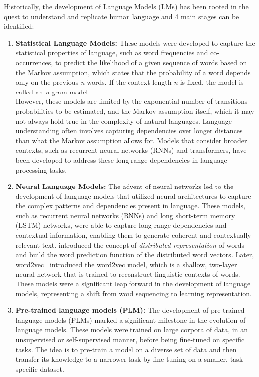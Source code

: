 Historically, the development of Language Models (LMs) has been rooted in the quest to understand and replicate human language and 4 main stages can be identified:
\begin{enumerate}
	\item \textbf{Statistical Language Models:} {These models were developed to capture the statistical properties of language, such as word frequencies and co-occurrences, to predict the likelihood of a given sequence of words based on the Markov assumption, which states that the probability of a word depends only on the previous \textit{n} words.
		      If the context length \textit{n} is fixed, the model is called an \textit{n}-gram model.\\
		      However, these models are limited by the exponential number of transitions probabilities to be estimated, and the Markov assumption itself, which it may not always hold true in the complexity of natural languages.
		      Language understanding often involves capturing dependencies over longer distances than what the Markov assumption allows for. Models that consider broader contexts, such as recurrent neural networks (RNNs) and transformers, have been developed to address these long-range dependencies in language processing tasks.}
	\item \textbf{Neural Language Models:} {The advent of neural networks led to the development of language models that utilized neural architectures to capture the complex patterns and dependencies present in language.
		      These models, such as recurrent neural networks (RNNs) and long short-term memory (LSTM) networks, were able to capture long-range dependencies and contextual information, enabling them to generate coherent and contextually relevant text.
		      \textcite{bengio2003neural} introduced the concept of \textit{distributed representation} of words and build the word prediction function of the distributed word vectors.
		      Later, word2vec~\cite{mikolov2013distributed, mikolov2013efficient} introduced the word2vec model, which is a shallow, two-layer neural network that is trained to reconstruct linguistic contexts of words.
		      These models were a significant leap forward in the development of language models, representing a shift from word sequencing to learning representation.}
	\item \textbf{Pre-trained language models (PLM):} {The development of pre-trained language models (PLMs) marked a significant milestone in the evolution of language models.
		      These models were trained on large corpora of data, in an unsupervised or self-supervised manner, before being fine-tuned on specific tasks. The idea is to pre-train a model on a diverse set of data and then transfer its knowledge to a narrower task by fine-tuning on a smaller, task-specific dataset.
}
\end{enumerate}
